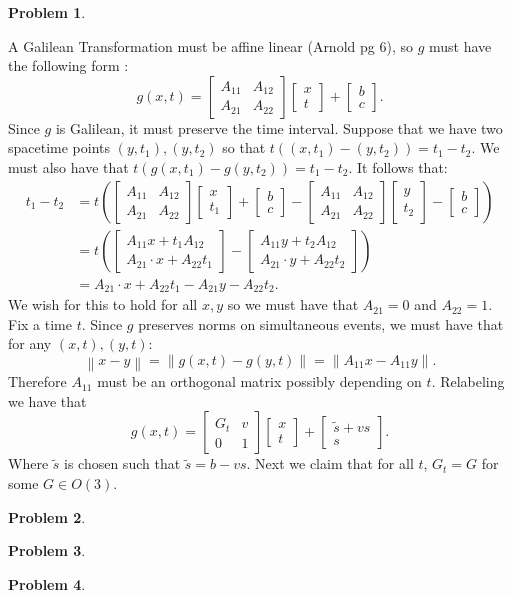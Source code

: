 \documentclass[12pt, a4paper]{article}
\title{}
\author{A.N.}
\date{\today}
\newtheorem{problem}{Problem}
\theoremstyle{definition}
\newcommand{\norm}[1]{\left\lVert#1\right\rVert}
\newcommand{\bmat}[1]{\begin{bmatrix}#1\end{bmatrix}}
\begin{document}
\begin{problem}
\end{problem}
A Galilean Transformation must be affine linear (Arnold pg 6), so $g$ must have the following form : 
$$g(x,t) = \bmat{A_{11} & A_{12} \\ A_{21}  & A_{22}} \bmat{x \\ t} + \bmat{b\\c }.$$ 
Since $g$ is Galilean, it must preserve the time interval. Suppose that we have two spacetime  points $(y,t_1), (y,t_2)$ so that $t( (x,t_1) -(y,t_2)  ) = t_1 - t_2$. We must also have that $t(g(x,t_1) - g(y, t_2)) = t_1 - t_2$. It follows that:
\begin{align*}t_1 - t_2 & = t \left( \bmat{A_{11} & A_{12} \\ A_{21}  & A_{22}} \bmat{x \\ t_1 } + \bmat{b\\c }  - \bmat{A_{11} & A_{12} \\ A_{21}  & A_{22}} \bmat{y \\ t_2} - \bmat{b\\c }\right)
	\\ & = t\left( \bmat{A_{11} x + t_1 A_{12} \\ A_{21} \cdot x + A_{22} t_1} - \bmat{A_{11} y + t_2 A_{12} \\ A_{21} \cdot y + A_{22} t_2} \right) 
	\\ & =A_{21} \cdot x + A_{22} t_1 - A_{21} y- A_{22} t_2.
\end{align*}
We wish for this to hold for all $x,y$  so we must have that $A_{21} = 0$ and $A_{22} = 1$. Fix a time $t$. Since $g$ preserves norms on simultaneous events, we must have that for any $(x,t), (y,t)$:
$$\norm{x- y} = \norm{g(x,t) - g(y,t)} = \norm{A_{11}x - A_{11} y}.$$
Therefore $A_{11}$ must be an orthogonal matrix possibly depending on $t$. Relabeling we have that 
$$g(x,t) = \bmat{G_t & v \\ 0 & 1 } \bmat{x\\t} + \bmat{ \tilde{s} + vs \\ s}. $$ 
Where $\tilde{s}$ is chosen such that $\tilde{s} = b - vs$. Next we claim that for all $t$, $G_t = G$ for some $G\in O(3)$. 
\newpage
\begin{problem}
\end{problem}
\newpage
\begin{problem}
\end{problem}
\newpage
\begin{problem}
\end{problem}
\end{document}
